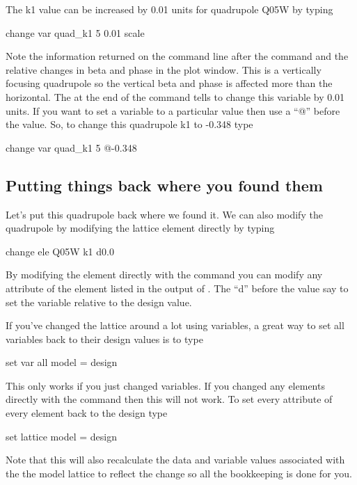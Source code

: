 The k1 value can be increased by 0.01 units for quadrupole Q05W by typing
\begin{example}
  change var quad\_k1 5 0.01
  scale
\end{example}
Note the information returned on the command line after the command and the relative changes in
beta and phase in the plot window. This is a vertically focusing quadrupole so
the vertical beta and phase is affected more than the horizontal. The 
at the end of the command tells \tao to change this variable by 0.01 units. If
you want to set a variable to a particular value then use a ``@'' before the
value. So, to change this quadrupole k1 to -0.348 type
\begin{example}
  change var quad\_k1 5 @-0.348
\end{example}

\subsection{Putting things back where you found them}
\label{ss:put_it_back}

Let's put this quadrupole back where we found it. We can also modify the quadrupole
by modifying the lattice element directly by typing
\begin{example}
  change ele Q05W k1 d0.0
\end{example}
By modifying the element directly with the  command you can
modify any attribute of the element listed in the output of .
The ``d'' before the value say to set the variable relative to the design value.

If you've changed the lattice around a lot using variables, a great way to set
all variables back to their design values is to type
\begin{example}
  set var all model = design
\end{example}
This only works if you just changed variables. If you changed any elements
directly with the  command then this will not work. To set
every attribute of every element back to the design type
\begin{example}
  set lattice model = design
\end{example}
Note that this will also recalculate the data and variable values associated with the
the model lattice to reflect the change so all the bookkeeping is done for you.


